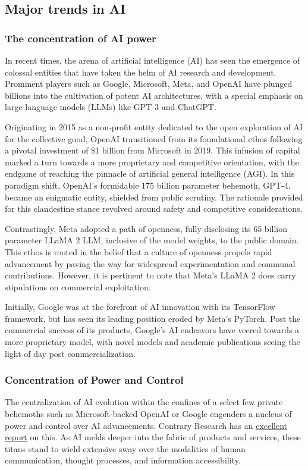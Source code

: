 %

\subsection{Major trends in AI}
\subsubsection{The concentration of AI power}
In recent times, the arena of artificial intelligence (AI) has seen the emergence of colossal entities that have taken the helm of AI research and development. Prominent players such as Google, Microsoft, Meta, and OpenAI have plunged billions into the cultivation of potent AI architectures, with a special emphasis on large language models (LLMs) like GPT-3 and ChatGPT.

Originating in 2015 as a non-profit entity dedicated to the open exploration of AI for the collective good, OpenAI transitioned from its foundational ethos following a pivotal investment of \$1 billion from Microsoft in 2019. This infusion of capital marked a turn towards a more proprietary and competitive orientation, with the endgame of reaching the pinnacle of artificial general intelligence (AGI). In this paradigm shift, OpenAI's formidable 175 billion parameter behemoth, GPT-4, became an enigmatic entity, shielded from public scrutiny. The rationale provided for this clandestine stance revolved around safety and competitive considerations.

Contrastingly, Meta adopted a path of openness, fully disclosing its 65 billion parameter LLaMA 2 LLM, inclusive of the model weights, to the public domain. This ethos is rooted in the belief that a culture of openness propels rapid advancement by paving the way for widespread experimentation and communal contributions. However, it is pertinent to note that Meta's LLaMA 2 does carry stipulations on commercial exploitation.

Initially, Google was at the forefront of AI innovation with its TensorFlow framework, but has seen its leading position eroded by Meta's PyTorch. Post the commercial success of its products, Google's AI endeavors have veered towards a more proprietary model, with novel models and academic publications seeing the light of day post commercialization.

\subsubsection{Concentration of Power and Control}
The centralization of AI evolution within the confines of a select few private behemoths such as Microsoft-backed OpenAI or Google engenders a nucleus of power and control over AI advancements. Contrary Research has an \href{https://research.contrary.com/reports/the-openness-of-ai}{excellent report} on this. As AI melds deeper into the fabric of products and services, these titans stand to wield extensive sway over the modalities of human communication, thought processes, and information accessibility.

